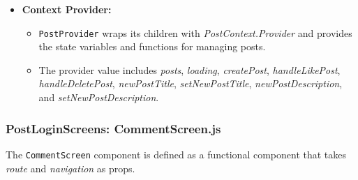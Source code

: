 \begin{itemize}
    \item \textbf{Context Provider:}
    \begin{itemize}
        \item \texttt{PostProvider} wraps its children with \textit{PostContext.Provider} and provides the state variables and functions for managing posts.
        \item The provider value includes \textit{posts}, \textit{loading}, \textit{createPost}, \textit{handleLikePost}, \textit{handleDeletePost}, \textit{newPostTitle}, \textit{setNewPostTitle}, \textit{newPostDescription}, and \textit{setNewPostDescription}.
    \end{itemize}
\end{itemize}

\subsubsection{PostLoginScreens: CommentScreen.js}

The \texttt{CommentScreen} component is defined as a functional component that takes \textit{route} and \textit{navigation} as props.

